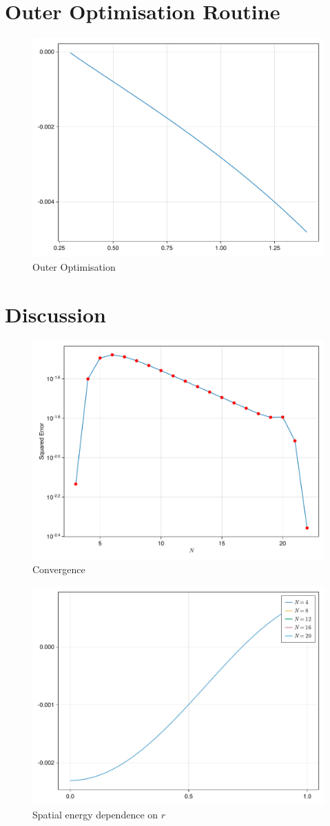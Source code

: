 \section{Outer Optimisation Routine}

\begin{figure}[H]
  \centering
  \label{fig:outer-optimisation}
  \includegraphics[width=0.8\linewidth]{../figures/results/outer-optimisation.pdf}
  \caption{Outer Optimisation}
\end{figure}

\section{Discussion}


\begin{figure}[H]
  \centering
  \label{fig:convergence}
  \includegraphics[width=0.7\linewidth]{../figures/results/convergence.pdf}
  \caption{Convergence}
\end{figure}

\begin{figure}[H]
  \centering
  \label{fig:spatial-energy-dependence}
  \includegraphics[width=0.6\linewidth]{../figures/results/energy-dependence-on-r.pdf}
  \caption{Spatial energy dependence on $r$}
\end{figure}
